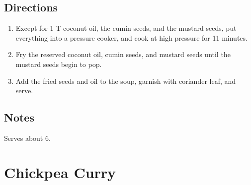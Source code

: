 \documentclass[letterpaper,10pt,english]{sphinxmanual}
\begin{document}
\section{Directions}
\label{mung_dal:directions}\begin{enumerate}
\item {} 
Except for 1 T coconut oil, the cumin seeds, and the mustard seeds, put everything into a pressure cooker, and cook at high pressure for 11 minutes.

\item {} 
Fry the reserved coconut oil, cumin seeds, and mustard seeds until the mustard seeds begin to pop.

\item {} 
Add the fried seeds and oil to the soup, garnish with coriander leaf, and serve.

\end{enumerate}


\section{Notes}
\label{mung_dal:notes}
Serves about 6.


\chapter{Chickpea Curry}
\label{chickpea_curry::doc}\label{chickpea_curry:chickpea-curry}
\end{document}
